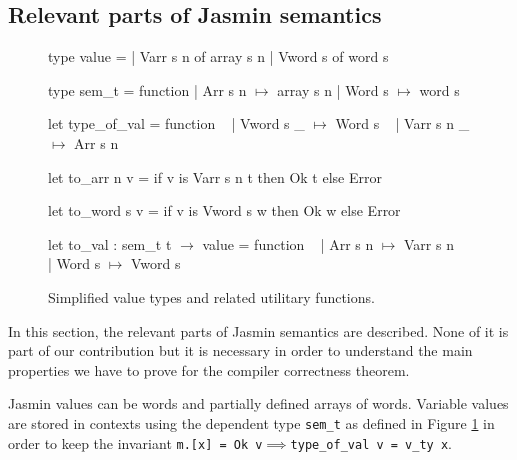 \documentclass{article}
\begin{document}
\subsection{Relevant parts of Jasmin semantics}\label{ssec:jassem}

\begin{figure}[t]
\obeylines\obeyspaces\ttfamily%
type value =
| Varr s n of array s n
| Vword s  of word  s

type sem\_t = function
| Arr s n \(\mapsto\) array s n
| Word s  \(\mapsto\) word  s

let type\_of\_val = function
~ | Vword s  \_ \(\mapsto\) Word s
~ | Varr s n \_ \(\mapsto\) Arr s n

let to\_arr  n v = if v is Varr s n t then Ok t else Error

let to\_word s v = if v is Vword s  w then Ok w else Error

let to\_val : sem\_t t \(\to\) value = function
~ | Arr s n \(\mapsto\) Varr s n
~ | Word s  \(\mapsto\) Vword s
\normalfont%
\caption{Simplified value types and related utilitary functions.}\label{fig:oldval}
\end{figure}

In this section, the relevant parts of Jasmin semantics are described. None of
it is part of our contribution but it is necessary in order to understand
the main properties we have to prove for the compiler correctness theorem.

Jasmin values can be words and partially defined arrays of words. Variable
values are stored in contexts using the dependent type \texttt{sem\_t} as
defined in Figure \ref{fig:oldval} in order to keep the invariant
\texttt{m.[x] = Ok v\(\implies\)type\_of\_val v = v\_ty x}.

\medskip
\end{document}
